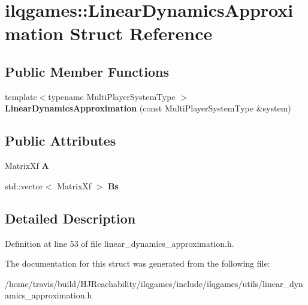 \hypertarget{structilqgames_1_1_linear_dynamics_approximation}{}\section{ilqgames\+:\+:Linear\+Dynamics\+Approximation Struct Reference}
\label{structilqgames_1_1_linear_dynamics_approximation}
\subsection*{Public Member Functions}
\begin{DoxyCompactItemize}
\item 
{\footnotesize template$<$typename Multi\+Player\+System\+Type $>$ }\\{\bfseries Linear\+Dynamics\+Approximation} (const Multi\+Player\+System\+Type \&system)\hypertarget{structilqgames_1_1_linear_dynamics_approximation_aa9006868bfdb5e6f9160ddb5758c42aa}{}\label{structilqgames_1_1_linear_dynamics_approximation_aa9006868bfdb5e6f9160ddb5758c42aa}

\end{DoxyCompactItemize}
\subsection*{Public Attributes}
\begin{DoxyCompactItemize}
\item 
Matrix\+Xf {\bfseries A}\hypertarget{structilqgames_1_1_linear_dynamics_approximation_a2587c5e802fe56485192dadd90203a7c}{}\label{structilqgames_1_1_linear_dynamics_approximation_a2587c5e802fe56485192dadd90203a7c}

\item 
std\+::vector$<$ Matrix\+Xf $>$ {\bfseries Bs}\hypertarget{structilqgames_1_1_linear_dynamics_approximation_ac57ed8a24e467da727811fe4251e5c72}{}\label{structilqgames_1_1_linear_dynamics_approximation_ac57ed8a24e467da727811fe4251e5c72}

\end{DoxyCompactItemize}


\subsection{Detailed Description}


Definition at line 53 of file linear\+\_\+dynamics\+\_\+approximation.\+h.



The documentation for this struct was generated from the following file\+:\begin{DoxyCompactItemize}
\item 
/home/travis/build/\+H\+J\+Reachability/ilqgames/include/ilqgames/utils/linear\+\_\+dynamics\+\_\+approximation.\+h\end{DoxyCompactItemize}
